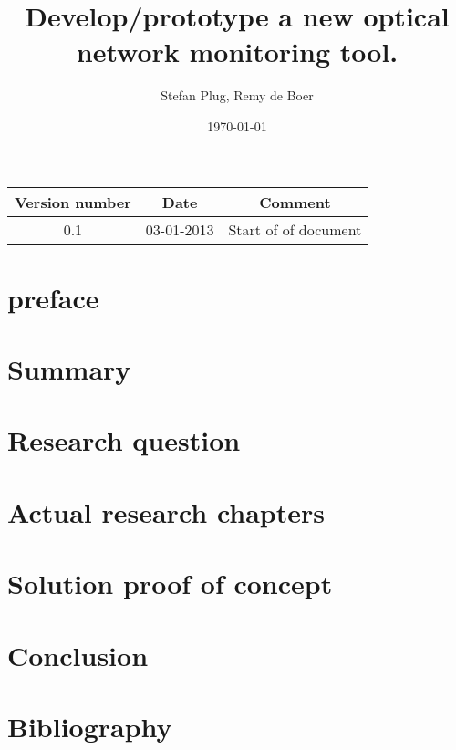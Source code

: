 \documentclass{article}
\begin{document}
\title{Develop/prototype a new optical network monitoring tool. }
\author{Stefan Plug, Remy de Boer}
\date{\today}
\maketitle

\begin{tabular}{|c|c|c|}
\hline 
Version number & Date & Comment \\ 
\hline 
0.1 & 03-01-2013 & Start of of document \\ 
\hline 
\end{tabular} 

\tableofcontents

\section{preface}

\section{Summary}

\section{Research question}

\section{Actual research chapters}

\section{Solution proof of concept}

\section{Conclusion}

\section{Bibliography}
\end{document}
